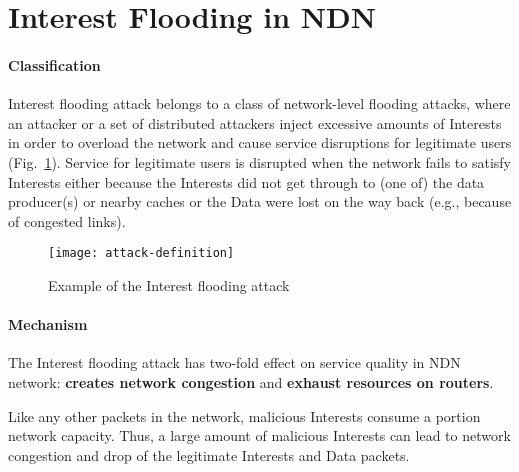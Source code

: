 \section{Interest Flooding in NDN}
\label{sec:interest flooding}



\paragraph{Classification}

Interest flooding attack belongs to a class of network-level flooding attacks, where an attacker or a set of distributed attackers inject excessive amounts of Interests in order to overload the network and cause service disruptions for legitimate users (Fig.~\ref{fig:flooding example}).
%
%
Service for legitimate users is disrupted when the network fails to satisfy Interests either because the Interests did not get through to (one of) the data producer(s) or nearby caches or the Data were lost on the way back (e.g., because of congested links).

\begin{figure}[htbp]
  \centering
  \texttt{[image: attack-definition]}
  \caption{Example of the Interest flooding attack}
  \label{fig:flooding example}
\end{figure}

\paragraph{Mechanism}

The Interest flooding attack has two-fold effect on service quality in NDN network: \textbf{creates network congestion} and \textbf{exhaust resources on routers}.

Like any other packets in the network, malicious Interests consume a portion network capacity.
Thus, a large amount of malicious Interests can lead to network congestion and drop of the legitimate Interests and Data packets.

